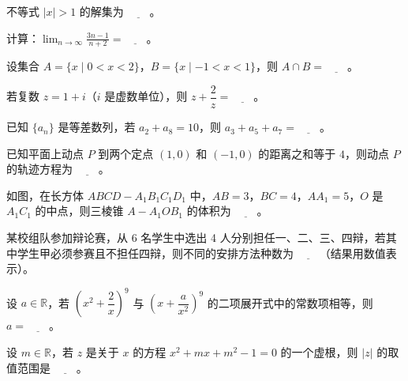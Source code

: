\begin{question}
不等式 $|x|>1$ 的解集为 $\underline{\qquad}$。

\end{question}
\begin{question}
计算：$\displaystyle\lim_{n\to\infty}\frac{3n-1}{n+2}=\underline{\qquad}$。

\end{question}
\begin{question}
设集合 $A=\{x\mid 0<x<2\}$，$B=\{x\mid -1<x<1\}$，则 $A\cap B=\underline{\qquad}$。

\end{question}
\begin{question}
若复数 $z=1+i$（$i$ 是虚数单位），则 $z+\dfrac{2}{z}=\underline{\qquad}$。

\end{question}
\begin{question}
已知 $\{a_n\}$ 是等差数列，若 $a_2+a_8=10$，则 $a_3+a_5+a_7=\underline{\qquad}$。

\end{question}
\begin{question}
已知平面上动点 $P$ 到两个定点 $(1,0)$ 和 $(-1,0)$ 的距离之和等于 $4$，则动点 $P$ 的轨迹方程为 $\underline{\qquad}$。

\Needspace{0.4\textheight}
\end{question}
\begin{question}
如图，在长方体 $ABCD-A_1B_1C_1D_1$ 中，$AB=3$，$BC=4$，$AA_1=5$，$O$ 是 $A_1C_1$ 的中点，则三棱锥 $A-A_1OB_1$ 的体积为 $\underline{\qquad}$。
\nopagebreak[4]
\begin{center}\end{center}
\nopagebreak[4]
\end{question}
\begin{question}
某校组队参加辩论赛，从 6 名学生中选出 4 人分别担任一、二、三、四辩，若其中学生甲必须参赛且不担任四辩，则不同的安排方法种数为 $\underline{\qquad}$（结果用数值表示）。

\end{question}
\begin{question}
设 $a\in\mathbb R$，若 $\left(x^2+\dfrac{2}{x}\right)^9$ 与 $\left(x+\dfrac{a}{x^2}\right)^9$ 的二项展开式中的常数项相等，则 $a=\underline{\qquad}$。

\end{question}
\begin{question}
设 $m\in\mathbb R$，若 $z$ 是关于 $x$ 的方程 $x^2+mx+m^2-1=0$ 的一个虚根，则 $|z|$ 的取值范围是 $\underline{\qquad}$。

\end{question}
